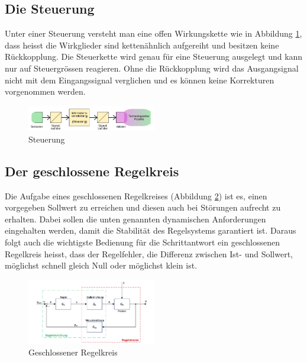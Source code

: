 \subsection{Die Steuerung}

Unter einer Steuerung  versteht man eine offen Wirkungskette  wie in Abbildung
\ref{fig:Steuerung},   dass  heisst   die  Wirkglieder   sind  ketten\"ahnlich
aufgereiht und besitzen keine R\"uckkopplung. Die Steuerkette wird genau f\"ur
eine Steuerung ausgelegt und kann  nur auf Steuergr\"ossen reagieren. Ohne die
R\"uckkopplung wird das Ausgangsignal  nicht mit dem Eingangssignal verglichen
und es k\"onnen keine Korrekturen vorgenommen werden.

\begin{figure}[!h!, width=\pagewidth]
    \centering
    \includegraphics[width=0.5\textwidth]{images/Steuerung}
    \caption{Steuerung}
    \label{fig:Steuerung}
\end{figure}

\subsection{Der geschlossene Regelkreis}
Die      Aufgabe     eines      geschlossenen     Regelkreises      (Abbildung
\ref{fig:geschlossenerRegelkreis})  ist  es,   einen  vorgegeben  Sollwert  zu
erreichen und diesen  auch bei St\"orungen aufrecht  zu erhalten. Dabei sollen
die unten  genannten dynamischen  Anforderungen eingehalten werden,  damit die
Stabilit\"at des Regelsystems garantiert ist. Daraus folgt auch die wichtigste
Bedienung f\"ur  die Schrittantwort ein geschlossenen  Regelkreis heisst, dass
der Regelfehler, die Differenz zwischen Ist- und Sollwert, m\"oglichst schnell
gleich Null oder m\"oglichst klein ist.


\begin{figure}[!h!, width=\pagewidth]
    \centering
    \includegraphics[width=0.5\textwidth]{images/geschlRegelkreis}
    \caption{Geschlossener Regelkreis}
    \label{fig:geschlossenerRegelkreis}
\end{figure}

